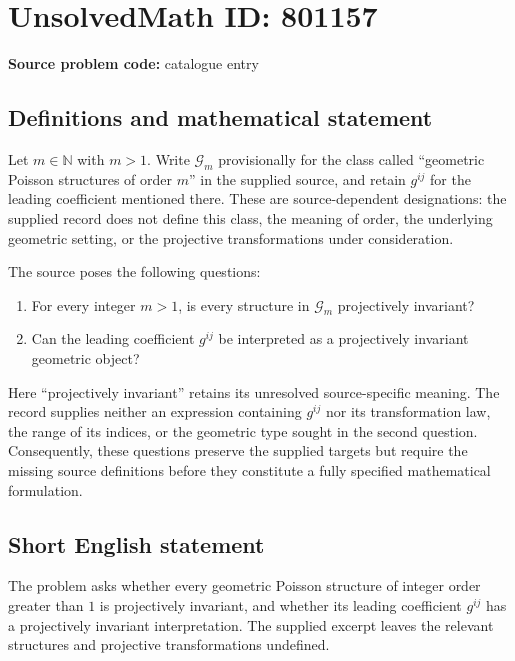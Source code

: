 \documentclass[11pt]{article}
\newcommand{\N}{\mathbb{N}}
\begin{document}
\section*{UnsolvedMath ID: 801157}
\textbf{Source problem code:} catalogue entry
\subsection{Definitions and mathematical statement}
Let \(m\in\N\) with \(m>1\). Write \(\mathcal G_m\) provisionally for the class called ``geometric Poisson structures of order \(m\)'' in the supplied source, and retain \(g^{ij}\) for the leading coefficient mentioned there. These are source-dependent designations: the supplied record does not define this class, the meaning of order, the underlying geometric setting, or the projective transformations under consideration.

The source poses the following questions:
\begin{enumerate}
\item For every integer \(m>1\), is every structure in \(\mathcal G_m\) projectively invariant?
\item Can the leading coefficient \(g^{ij}\) be interpreted as a projectively invariant geometric object?
\end{enumerate}

Here ``projectively invariant'' retains its unresolved source-specific meaning. The record supplies neither an expression containing \(g^{ij}\) nor its transformation law, the range of its indices, or the geometric type sought in the second question. Consequently, these questions preserve the supplied targets but require the missing source definitions before they constitute a fully specified mathematical formulation.
\subsection{Short English statement}
The problem asks whether every geometric Poisson structure of integer order greater than \(1\) is projectively invariant, and whether its leading coefficient \(g^{ij}\) has a projectively invariant interpretation. The supplied excerpt leaves the relevant structures and projective transformations undefined.
\end{document}
